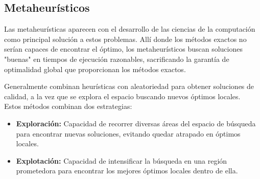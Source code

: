\documentclass[12pt,a4paper]{book}
\begin{document}
\subsection{Metaheurísticos}
Las metaheurísticas aparecen con el desarrollo de las ciencias de la computación como principal solución a estos problemas. Allí donde los métodos exactos no serían capaces de encontrar el óptimo,
los metaheurísticos buscan soluciones "buenas" en tiempos de ejecución razonables, sacrificando la garantía de optimalidad global que proporcionan los métodos exactos.

Generalmente combinan heurísticas con aleatoriedad para obtener soluciones de calidad, a la vez que se explora el espacio buscando nuevos óptimos locales.\\
Estos métodos combinan dos estrategias:
\begin{itemize}
    \item \textbf{Exploración:} Capacidad de recorrer diversas áreas del espacio de búsqueda para encontrar nuevas soluciones, evitando quedar atrapado en óptimos locales.
    \item \textbf{Explotación:} Capacidad de intensificar la búsqueda en una región prometedora para encontrar los mejores óptimos locales dentro de ella.
\end{itemize}
\end{document}
